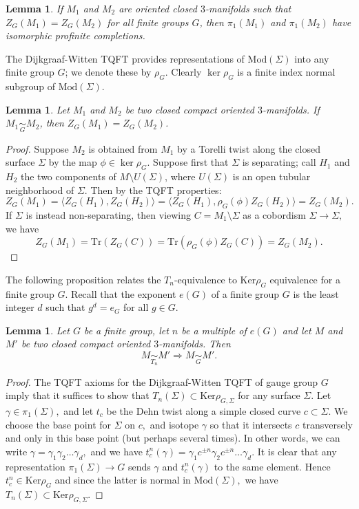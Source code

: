 \documentclass[12pt]{amsart}
\newtheorem{lem}[thm]{Lemma}
\theoremstyle{definition}
\begin{document}
\begin{lem}\cite[Lemma 7.10]{Fun13}\label{lem:Funar}
	If $M_1$ and $M_2$ are oriented closed $3$-manifolds such that $Z_G(M_1)=Z_G(M_2)$ for all finite groups $G$, then $\pi_1(M_1)$ and $\pi_1(M_2)$ have isomorphic profinite completions.
\end{lem}

The Dijkgraaf-Witten TQFT provides representations of $\mathrm{Mod}(\Sigma)$ into any finite group $G$; we denote these by $\rho_G$. Clearly $\ker \rho_G$ is a finite index normal subgroup of $\mathrm{Mod}(\Sigma)$.

\begin{lem}\label{lemma:Gequiv-DWinvariants}
	Let $M_1$ and $M_2$ be two closed compact oriented $3$-manifolds. If $M_1\underset{G}{\sim}M_2$, then $Z_G(M_1)=Z_G(M_2)$.
\end{lem}
\begin{proof}
	Suppose $M_2$ is obtained from $M_1$ by a Torelli twist along the closed surface $\Sigma$ by the map $\phi\in \ker \rho_G$. Suppose first that $\Sigma$ is separating; call $H_1$ and $H_2$ the two components of $M\setminus U(\Sigma)$, where $U(\Sigma)$ is an open tubular neighborhood of $\Sigma$. Then by the TQFT properties:
	$$Z_G(M_1)=\langle Z_G(H_1),Z_G(H_2)\rangle=\langle Z_G(H_1),\rho_G(\phi) Z_G(H_2)\rangle=Z_G(M_2).$$
	If $\Sigma$ is instead non-separating, then viewing $C=M_1\setminus \Sigma$ as a cobordism $\Sigma\longrightarrow \Sigma,$ we have
	$$Z_G(M_1)=\mathrm{Tr}(Z_G(C))=\mathrm{Tr}(\rho_G(\phi)Z_G(C))=Z_G(M_2).$$
\end{proof}

The following proposition relates the $T_n$-equivalence to $\mathrm{Ker} \rho_G$ equivalence for a finite group $G.$ Recall that the exponent $e(G)$ of a finite group $G$ is the least integer $d$ such that $g^d=e_G$ for all $g\in G.$

\begin{lem}
	Let $G$ be a finite group, let $n$ be a multiple of $e(G)$ and let $M$ and $M'$ be two closed compact oriented $3$-manifolds. Then 
	$$M\underset{T_n}{\sim}M'\Longrightarrow M\underset{G}{\sim}M'.$$
\end{lem}

\begin{proof}
	The TQFT axioms for the Dijkgraaf-Witten TQFT of gauge group $G$ imply that it suffices to show that $T_n(\Sigma)\subset \mathrm{Ker}\rho_{G,\Sigma}$ for any surface $\Sigma.$ Let $\gamma\in \pi_1(\Sigma),$ and let $t_c$ be the Dehn twist along a simple closed curve $c\subset \Sigma.$ We choose the base point for $\Sigma$ on $c,$ and isotope $\gamma$ so that it intersects $c$ transversely and only in this base point (but perhaps several times). In other words, we can write $\gamma=\gamma_1\gamma_2\ldots \gamma_d,$ and we have $t_c^n(\gamma)=\gamma_1 c^{\pm n} \gamma_2 c^{\pm n} \ldots \gamma_d.$ It is clear that any representation $\pi_1(\Sigma)\longrightarrow G$ sends $\gamma$ and $t_c^n(\gamma)$ to the same element. Hence $t_c^n \in \mathrm{Ker} \rho_G$ and since the latter is normal in $\mathrm{Mod}(\Sigma),$ we have $T_n(\Sigma)\subset \mathrm{Ker}\rho_{G,\Sigma}.$
\end{proof}
\end{document}
